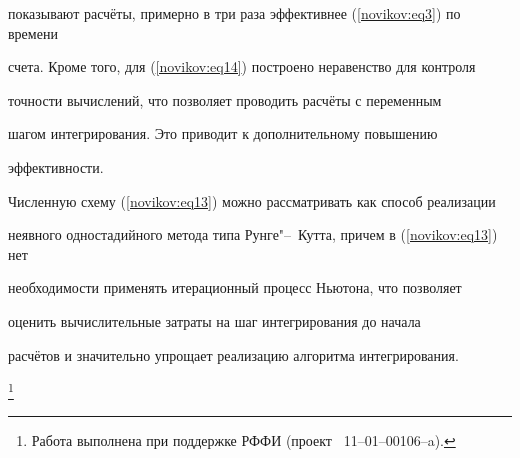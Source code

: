 показывают расчёты, примерно в три раза эффективнее (\ref{novikov:eq3}) по времени

счета. Кроме того, для (\ref{novikov:eq14}) построено неравенство для контроля

точности вычислений, что позволяет проводить расчёты с переменным

шагом интегрирования. Это приводит к дополнительному повышению

эффективности.



Численную схему (\ref{novikov:eq13}) можно рассматривать как способ реализации

неявного одностадийного метода типа Рунге"--~Кутта, причем в (\ref{novikov:eq13}) нет

необходимости применять итерационный процесс Ньютона, что позволяет

оценить вычислительные затраты на шаг интегрирования до начала

расчётов и значительно упрощает реализацию алгоритма интегрирования.



\thanks{Работа выполнена при поддержке РФФИ (проект \No~11--01--00106--a).}




\pagebreak



